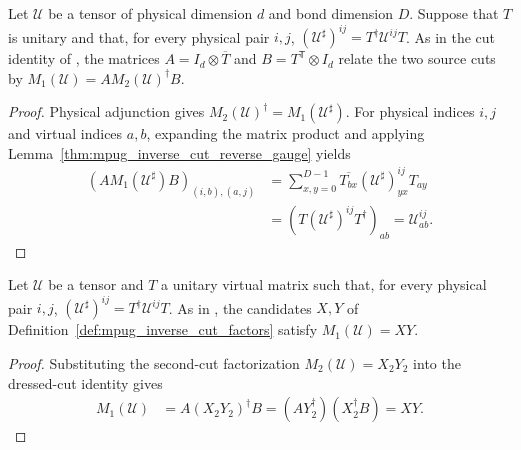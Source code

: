 \begin{lemma}
    \label{thm:mpug_inverse_cut_dressed}
    \leanok
    Let $\mathcal U$ be a tensor of physical dimension $d$ and bond
    dimension $D$. Suppose that $T$ is unitary and that, for every
    physical pair $i,j$, $(\mathcal U^\sharp)^{ij}=T^\dagger\mathcal U^{ij}T$.
    As in the cut identity of
    \cite[lines~5391--5431]{FrancoRubio2025MPUGauging}, the matrices
    $A=I_d\otimes\overline T$ and $B=T^{\mathsf T}\otimes I_d$ relate the two
    source cuts by
    $M_1(\mathcal U)=AM_2(\mathcal U)^\dagger B$.
\end{lemma}
\begin{proof}\leanok
    Physical adjunction gives
    $M_2(\mathcal U)^\dagger=M_1(\mathcal U^\sharp)$.
    For physical indices $i,j$ and virtual indices $a,b$, expanding the matrix
    product and applying Lemma~\ref{thm:mpug_inverse_cut_reverse_gauge} yields
    \begin{align}
        (AM_1(\mathcal U^\sharp)B)_{(i,b),(a,j)}
         & =\sum_{x,y=0}^{D-1}\overline{T_{bx}}
        (\mathcal U^\sharp)^{ij}_{yx}T_{ay}           \\
         & =(T(\mathcal U^\sharp)^{ij}T^\dagger)_{ab}
        =\mathcal U^{ij}_{ab}.
    \end{align}
\end{proof}

\begin{lemma}
    \label{thm:mpug_inverse_cut_factorization}
    \leanok
    Let $\mathcal U$ be a tensor and $T$ a unitary virtual matrix such
    that, for every physical pair $i,j$,
    $(\mathcal U^\sharp)^{ij}=T^\dagger\mathcal U^{ij}T$. As in
    \cite[line~5432]{FrancoRubio2025MPUGauging}, the candidates $X,Y$ of
    Definition~\ref{def:mpug_inverse_cut_factors} satisfy
    $M_1(\mathcal U)=XY$.
\end{lemma}
\begin{proof}\leanok
    Substituting the second-cut factorization $M_2(\mathcal U)=X_2Y_2$ into the
    dressed-cut identity gives
    \begin{align}
        M_1(\mathcal U)
         & =A(X_2Y_2)^\dagger B
        =(AY_2^\dagger)(X_2^\dagger B)=XY.
    \end{align}
\end{proof}

